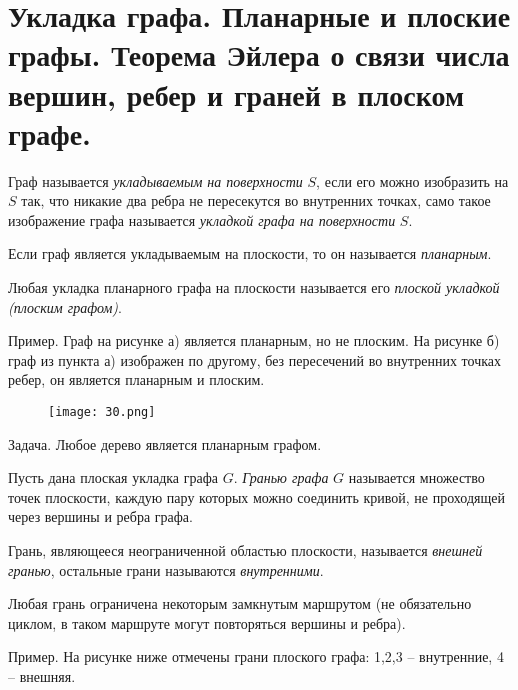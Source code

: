 \section{Укладка графа. Планарные и плоские графы. Теорема Эйлера о связи числа вершин, ребер и 
граней в плоском графе.}

\begin{definition}
    Граф называется \textit{укладываемым на поверхности} $S$, если его
    можно изобразить на $S$ так, что никакие два ребра не пересекутся во
    внутренних точках, само такое изображение графа называется \textit{укладкой графа
    на поверхности} $S$.
\end{definition}

\begin{definition}
    Если граф является укладываемым на плоскости, то он
    называется \textit{планарным}.
\end{definition}

\begin{definition}
    Любая укладка планарного графа на плоскости называется его
    \textit{плоской укладкой (плоским графом)}.
\end{definition}

Пример. Граф на рисунке а) является планарным, но не плоским. На рисунке
б) граф из пункта а) изображен по другому, без пересечений во внутренних
точках ребер, он является планарным и плоским.
\begin{figure}[h]
    \centering
    \texttt{[image: 30.png]}
\end{figure}

Задача. Любое дерево является планарным графом.

\begin{definition}
    Пусть дана плоская укладка графа $G$. \textit{Гранью графа} $G$
    называется множество точек плоскости, каждую пару которых можно
    соединить кривой, не проходящей через вершины и ребра графа.
\end{definition}

\begin{definition}
    Грань, являющееся неограниченной областью плоскости,
    называется \textit{внешней гранью}, остальные грани называются \textit{внутренними}.
\end{definition}

Любая грань ограничена некоторым замкнутым маршрутом (не обязательно
циклом, в таком маршруте могут повторяться вершины и ребра).

Пример. На рисунке ниже отмечены грани плоского графа: 1,2,3 -- внутренние,
4 -- внешняя.

